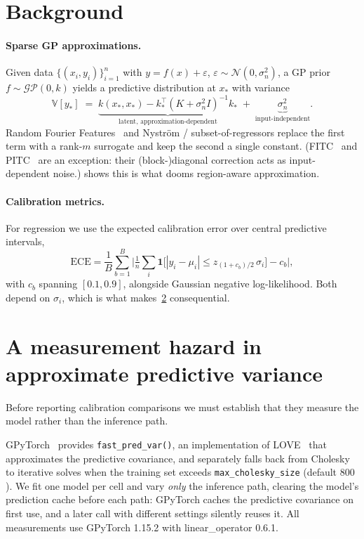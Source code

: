 \documentclass[11pt]{article}
\newcommand{\ece}{\mathrm{ECE}}
\begin{document}
\section{Background}
\label{sec:background}

\paragraph{Sparse GP approximations.} Given data $\{(x_i,y_i)\}_{i=1}^n$ with
$y = f(x) + \varepsilon$, $\varepsilon \sim \mathcal{N}(0,\sigma_n^2)$, a GP prior
$f \sim \mathcal{GP}(0,k)$ yields a predictive distribution at $x_*$ with variance
\begin{equation}
\label{eq:var}
\mathbb{V}[y_*] \;=\; \underbrace{k(x_*,x_*) - k_*^\top (K+\sigma_n^2 I)^{-1} k_*}_{\text{latent, approximation-dependent}} \;+\; \underbrace{\sigma_n^2}_{\text{input-independent}}.
\end{equation}
Random Fourier Features~\citep{rahimi2007} and Nystr\"om / subset-of-regressors
\citep{williams2001, smola2000} replace the first term with a rank-$m$ surrogate and
keep the second a single constant. (FITC~\citep{snelson2006} and
PITC~\citep{quinonero2005} are an exception: their (block-)diagonal correction acts as
input-dependent noise.)  shows this is what
dooms region-aware approximation.

\paragraph{Calibration metrics.} For regression we use the expected calibration error
over central predictive intervals,
\begin{equation}
\ece = \frac{1}{B}\sum_{b=1}^{B} \Big| \tfrac{1}{n}\textstyle\sum_i \mathbf{1}\big[|y_i-\mu_i| \le z_{(1+c_b)/2}\,\sigma_i\big] - c_b \Big|,
\end{equation}
with $c_b$ spanning $[0.1,0.9]$, alongside Gaussian negative log-likelihood. Both
depend on $\sigma_i$, which is what makes~\cref{sec:hazard} consequential.

\section{A measurement hazard in approximate predictive variance}
\label{sec:hazard}

Before reporting calibration comparisons we must establish that they measure the
model rather than the inference path.

GPyTorch~\citep{gardner2018} provides \texttt{fast\_pred\_var()}, an implementation of
LOVE~\citep{pleiss2018} that approximates the predictive covariance, and separately
falls back from Cholesky to iterative solves when the training set exceeds
\texttt{max\_cholesky\_size} (default $800$). We fit one model per cell and vary
\emph{only} the inference path, clearing the model's prediction cache before each path:
GPyTorch caches the predictive covariance on first use, and a later call with
different settings silently reuses it. All measurements use GPyTorch 1.15.2 with
linear\_operator 0.6.1.
\end{document}
